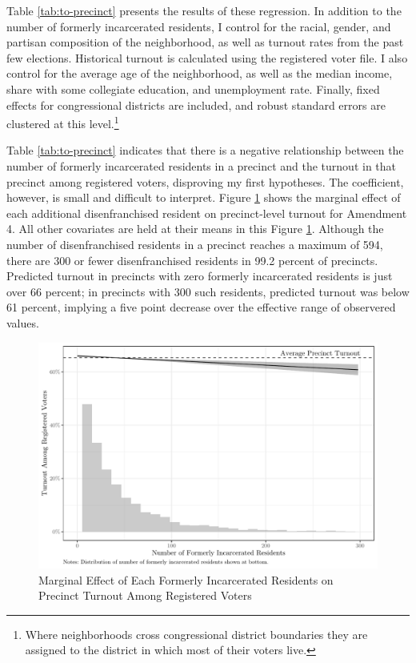 \documentclass[
  12pt,
]{article}
\begin{document}
Table \ref{tab:to-precinct} presents the results of these regression. In addition to the number of formerly incarcerated residents, I control for the racial, gender, and partisan composition of the neighborhood, as well as turnout rates from the past few elections. Historical turnout is calculated using the registered voter file. I also control for the average age of the neighborhood, as well as the median income, share with some collegiate education, and unemployment rate. Finally, fixed effects for congressional districts are included, and robust standard errors are clustered at this level.\footnote{Where neighborhoods cross congressional district boundaries they are assigned to the district in which most of their voters live.}

\begin{singlespace}


\end{singlespace}

Table \ref{tab:to-precinct} indicates that there is a negative relationship between the number of formerly incarcerated residents in a precinct and the turnout in that precinct among registered voters, disproving my first hypotheses. The coefficient, however, is small and difficult to interpret. Figure \ref{fig:marg1} shows the marginal effect of each additional disenfranchised resident on precinct-level turnout for Amendment 4. All other covariates are held at their means in this Figure \ref{fig:marg1}. Although the number of disenfranchised residents in a precinct reaches a maximum of 594, there are 300 or fewer disenfranchised residents in 99.2 percent of precincts. Predicted turnout in precincts with zero formerly incarcerated residents is just over 66 percent; in precincts with 300 such residents, predicted turnout was below 61 percent, implying a five point decrease over the effective range of observered values.

\begin{figure}[H]

{\centering \includegraphics{amendment_4_turnout_files/figure-latex/marg1-1} 

}

\caption{\label{fig:marg1}Marginal Effect of Each Formerly Incarcerated Residents on Precinct Turnout Among Registered Voters}\label{fig:marg1}
\end{figure}
\end{document}

